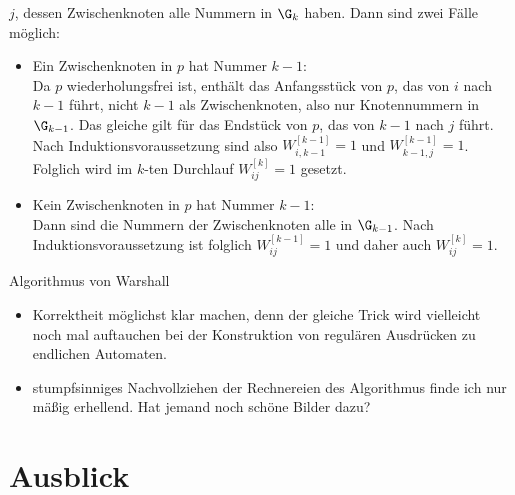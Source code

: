 \begin{beweis}
\begin{description}
\begin{itemize}
      $j$, dessen Zwischenknoten alle Nummern in $\G_k$ haben. Dann
      sind zwei Fälle möglich:
      \begin{itemize}
      \item Ein Zwischenknoten in $p$ hat Nummer $k-1$: \\
        Da $p$ wiederholungsfrei ist, enthält das Anfangsstück von
        $p$, das von $i$ nach $k-1$ führt, nicht $k-1$ als
        Zwischenknoten, also nur Knotennummern in $\G_{k-1}$. Das
        gleiche gilt für das Endstück von $p$, das von $k-1$ nach $j$
        führt. Nach Induktionsvoraussetzung sind also
        $W^{[k-1]}_{i,k-1}=1$ und $W^{[k-1]}_{k-1,j}=1$. Folglich wird im
        $k$-ten Durchlauf $W^{[k]}_{ij}=1$ gesetzt.
      \item Kein Zwischenknoten in $p$ hat Nummer $k-1$: \\
        Dann sind die Nummern der Zwischenknoten alle in
        $\G_{k-1}$. Nach Induktionsvoraussetzung ist folglich
        $W^{[k-1]}_{ij}=1$ und daher auch $W^{[k]}_{ij}=1$.
      \end{itemize}
    \end{itemize}
  \end{description}
\end{beweis}
%
\begin{tutorium}
  Algorithmus von Warshall
  \begin{itemize}
  \item Korrektheit möglichst klar machen, denn der gleiche Trick
    wird vielleicht noch mal auftauchen bei der Konstruktion von
    regulären Ausdrücken zu endlichen Automaten.
  \item stumpfsinniges Nachvollziehen der Rechnereien des
    Algorithmus finde ich nur mäßig erhellend. Hat jemand noch
    schöne Bilder dazu?
  \end{itemize}
\end{tutorium}


\section{Ausblick}

